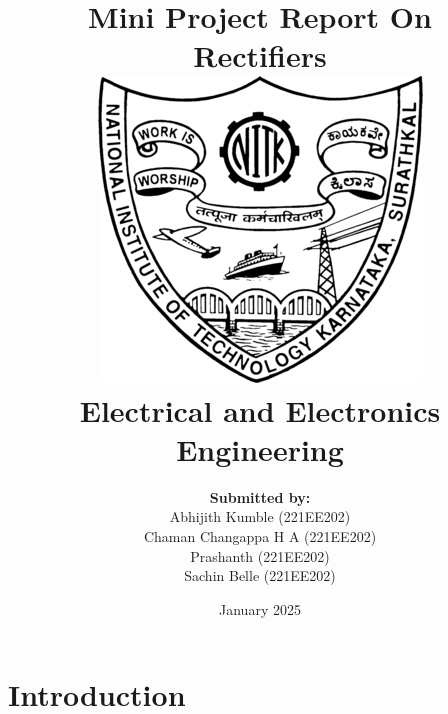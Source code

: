 \documentclass[a4paper, 12pt]{report} %
\title{
    \vspace{-3cm} %
    \textbf{Mini Project Report On} \\
    \vspace{0.5cm}
    \textbf{Rectifiers} \\
    \vspace{1cm}
    \includegraphics[scale=0.5]{NITK_Emblem.png} \\
    \vspace{1cm}
    \textbf{Electrical and Electronics \\ Engineering}
    \vspace{-1cm} %
}
\author{
    \vspace{1cm} %
    \textbf{Submitted by: \\}
    Abhijith Kumble (221EE202)\\ 
    Chaman Changappa H A (221EE202)\\ 
    Prashanth (221EE202)\\ 
    Sachin Belle (221EE202)
}
\date{\vspace{0.5cm}January 2025} %
\affil{
    \vspace{1cm} %
    \textbf{Under the guidance of} \\ 
    Dr. Ravi Raushan \\
    \vspace{0.5cm} %
    \textbf{Department of Electrical and Electronics Engineering} \\
    National Institute of Technology, Surathkal
}
\begin{document}
\singlespacing
\maketitle
\onehalfspacing
\section{Introduction}

\end{document}

